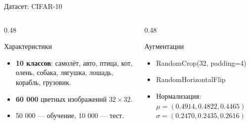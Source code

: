 \documentclass[11pt,aspectratio=169]{beamer}
\begin{document}
\begin{frame}{Датасет: CIFAR-10}
  \begin{columns}[T]
    \begin{column}{0.48\textwidth}
      \begin{block}{Характеристики}
        \begin{itemize}
          \item \textbf{10 классов}: самолёт, авто, птица, кот, олень, собака,
                лягушка, лошадь, корабль, грузовик.
          \item \textbf{60 000} цветных изображений \(32 \times 32\).
          \item 50 000 — обучение, 10 000 — тест.
        \end{itemize}
      \end{block}
    \end{column}
    \begin{column}{0.48\textwidth}
      \begin{block}{Аугментации}
        \begin{itemize}
          \item RandomCrop(32, padding=4)
          \item RandomHorizontalFlip
          \item Нормализация:
                \(\mu = (0.4914, 0.4822, 0.4465)\)
                \(\sigma = (0.2470, 0.2435, 0.2616)\)
        \end{itemize}
      \end{block}
    \end{column}
  \end{columns}
\end{frame}
\end{document}
